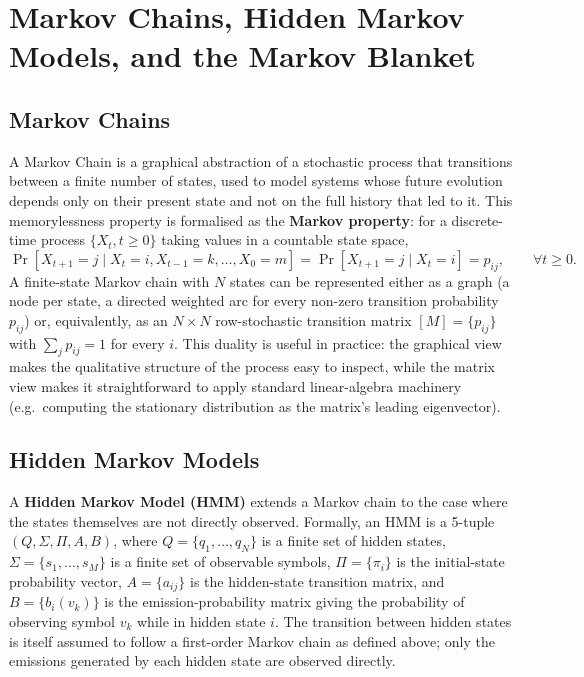 \section{Markov Chains, Hidden Markov Models, and the Markov Blanket}
\label{sec:markov-chain-blanket}

\subsection{Markov Chains}

A Markov Chain is a graphical abstraction of a stochastic process that
transitions between a finite number of states, used to model systems whose
future evolution depends only on their present state and not on the full
history that led to it. This memorylessness property is formalised as the
\textbf{Markov property}: for a discrete-time process $\{X_t, t \ge 0\}$
taking values in a countable state space,
\[
  \Pr[X_{t+1} = j \mid X_t = i, X_{t-1} = k, \ldots, X_0 = m]
  = \Pr[X_{t+1} = j \mid X_t = i] = p_{ij}, \qquad \forall t \ge 0.
\]
A finite-state Markov chain with $N$ states can be represented either as a
graph (a node per state, a directed weighted arc for every non-zero
transition probability $p_{ij}$) or, equivalently, as an $N \times N$
row-stochastic transition matrix $[M] = \{p_{ij}\}$ with $\sum_j p_{ij} = 1$
for every $i$. This duality is useful in practice: the graphical view makes
the qualitative structure of the process easy to inspect, while the matrix
view makes it straightforward to apply standard linear-algebra machinery
(e.g.\ computing the stationary distribution as the matrix's leading
eigenvector).

\subsection{Hidden Markov Models}

A \textbf{Hidden Markov Model (HMM)} extends a Markov chain to the case where
the states themselves are not directly observed. Formally, an HMM is a
5-tuple $(Q, \Sigma, \Pi, A, B)$, where $Q = \{q_1, \ldots, q_N\}$ is a finite
set of hidden states, $\Sigma = \{s_1, \ldots, s_M\}$ is a finite set of
observable symbols, $\Pi = \{\pi_i\}$ is the initial-state probability
vector, $A = \{a_{ij}\}$ is the hidden-state transition matrix, and
$B = \{b_i(v_k)\}$ is the emission-probability matrix giving the probability
of observing symbol $v_k$ while in hidden state $i$. The transition between
hidden states is itself assumed to follow a first-order Markov chain as
defined above; only the emissions generated by each hidden state are
observed directly.

